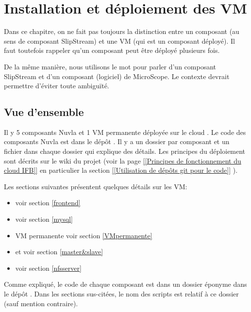 \chapter{Installation et déploiement des VM} \label{chap:deploiement_VM}

Dans ce chapitre, on ne fait pas toujours la distinction entre un composant (au sens de composant SlipStream)
et une VM (qui est un composant déployé).
Il faut toutefois rappeler qu'un composant peut être déployé plusieurs fois.

De la même manière, nous utilisons le mot  pour parler d'un composant SlipStream
et d'un composant (logiciel) de MicroScope.
Le contexte devrait permettre d'éviter toute ambiguïté.

\section{Vue d'ensemble}

Il y 5 composants Nuvla et
1 VM permanente déployée sur le cloud .
Le code des composants Nuvla est dans le dépôt .
Il y a un dossier par composant et un fichier  dans chaque dossier qui explique des détails.
Les principes du déploiement sont décrits sur le wiki du projet (voir la page
\href{https://intranet.genoscope.cns.fr/agc/redmine/projects/microcloud/wiki/Principes_de_fonctionnement_du_cloud_IFB}
{[[Principes de fonctionnement du cloud IFB]]}
en particulier la section
\href{https://intranet.genoscope.cns.fr/agc/redmine/projects/microcloud/wiki/Principes_de_fonctionnement_du_cloud_IFB#Utilisation-de-deacutepocircts-git-pour-le-code}
{[[Utilisation de dépôts git pour le code]]}
).

Les sections suivantes présentent quelques détails sur les VM:
\begin{itemize}
    \item {} voir section \ref{frontend}
    \item {} voir section \ref{mysql}
    \item VM permanente voir section \ref{VMpermanente}
    \item {} et  voir section \ref{master&slave}
    \item {} voir section \ref{nfsserver}
\end{itemize}
Comme expliqué, le code de chaque composant est dans un dossier éponyme dans le dépôt .
Dans les sections sus-citées, le nom des scripts est relatif à ce dossier (sauf mention contraire).

